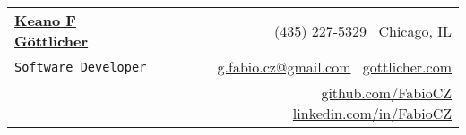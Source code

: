 \documentclass[letterpaper,11pt]{article}
\begin{document}
\newcommand{\mywebheader}{
\begin{tabular*}{7in}{l@{\extracolsep{\fill}}r}
	\textbf{\href{http://www.gottlicher.com/}{\LARGE Keano F G{\" o}ttlicher}} & \faPhone \ (435) 227-5329 \faHome \ Chicago, IL\\
	{\texttt{{Software Developer}}} & \faEnvelope \ \href{mailto:g.fabio.cz@gmail.com}{g.fabio.cz@gmail.com} \faGlobe \  \href{http://www.gottlicher.com}{gottlicher.com}\\
	  & \faGithub \  \href{http://www.github.com/FabioCZ}{github.com/FabioCZ} \faLinkedin \  \href{http://www.linkedin.com/in/FabioCZ}{linkedin.com/in/FabioCZ}
	\end{tabular*}
\\
\vspace{0.1in}}

\mywebheader
\end{document}
